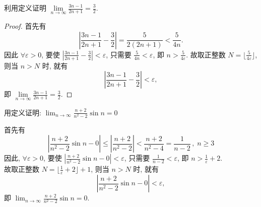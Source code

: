 \documentclass[color=green,titlestyle=hang]{elegantbook}%
\begin{document}

\begin{example}
利用定义证明 $\lim\limits_{n\to\infty}\frac{3n-1}{2n+1}=\frac{3}{2}$.
\end{example}\begin{proof}
首先有 \[\left|\frac{3n-1}{2n+1}-\frac{3}{2}\right|=\frac{5}{2(2n+1)}<\frac{5}{4n}.\]
因此 $\forall \varepsilon >0$,
要使 $\left|\frac{3n-1}{2n+1}-\frac{3}{2}\right|<\varepsilon$, 只需要 $\frac{5}{4n}<\varepsilon$, 即 $n>\frac{5}{4\varepsilon}$.
故取正整数 $N=\Big\lfloor\frac{5}{4\varepsilon}\Big\rfloor$, \\
则当 $n>N$ 时, 就有\[\left|\frac{3n-1}{2n+1}-\frac{3}{2}\right|<\varepsilon,\]
即 $\lim\limits_{n\to\infty}\frac{3n-1}{2n+1}=\frac{3}{2}$. 		
\end{proof}

\begin{example}
用定义证明:  $\lim_{n\to\infty}\frac{n+2}{n^2-2}\sin n=0$
\end{example}\begin{solution}
首先有 \[\left|\frac{n+2}{n^2-2}\sin n-0\right|\leqslant\left|\frac{n+2}{n^2-2}\right|<\frac{n+2}{n^2-4}=\frac{1}{n-2}\,,\;n\geqslant3\]
因此, $\forall \varepsilon >0$,
要使 $\left|\frac{n+2}{n^2-2}\sin n-0\right|<\varepsilon$, 只需要 $\frac{1}{n-2}<\varepsilon$, 即 $n>\frac{1}{\varepsilon}+2$.\\
故取正整数 $N=\big\lfloor\tfrac{1}{\varepsilon}+2\big\rfloor+1$, 
则当 $n>N$ 时, 就有\[\left|\frac{n+2}{n^2-2}\sin n-0\right|<\varepsilon,\]
即 $\lim_{n\to\infty}\frac{n+2}{n^2-2}\sin n=0$. 
\end{solution}
\end{document}
